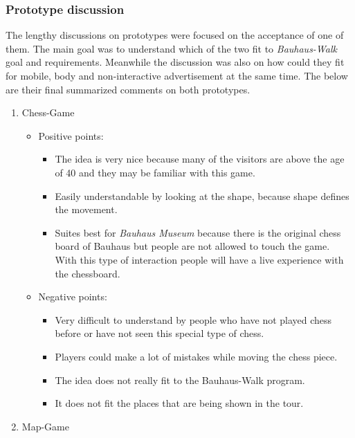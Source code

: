 \subsubsection{Prototype discussion}
The lengthy discussions on prototypes were focused on the acceptance of one of them. The main goal was to understand which of the two fit to \emph{Bauhaus-Walk} goal and requirements. Meanwhile the discussion was also on how could they fit for mobile, body and non-interactive advertisement at the same time. The below are their final summarized comments on both prototypes. 


\begin {enumerate}

\item Chess-Game

\begin {itemize}

\item{Positive points:} 

\begin {itemize}
\item   The idea is very nice because many of the visitors are above the age of 40 and they may be familiar with this game.
\item   Easily understandable by looking at the shape, because shape defines the movement. 
\item   Suites best for \emph{Bauhaus Museum} because there is the original chess board of Bauhaus but people are not allowed to touch the game. With this type of interaction people will have a live experience with the chessboard.
\end {itemize}

\item{Negative points:} \
\begin {itemize}
\item   Very difficult to understand by people who have not played chess before or have not seen this special type of chess.
\item   Players could make a lot of mistakes while moving the chess piece. 
\item   The idea does not really fit to the Bauhaus-Walk program.
\item   It does not fit the places that are being shown in the tour.
\end {itemize}
\end {itemize}


\item Map-Game 


\end{enumerate}
